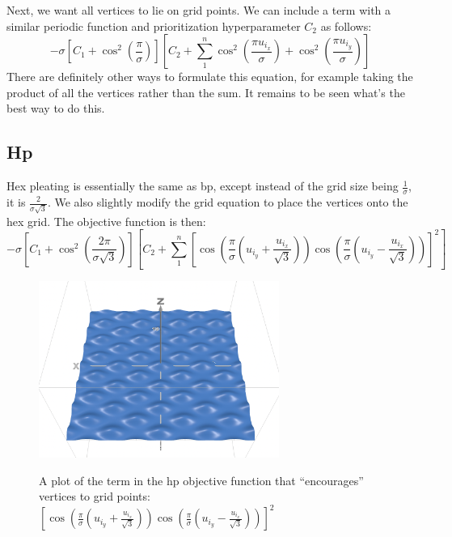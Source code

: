 \documentclass[12pt]{article}
\begin{document}
Next, we want all vertices to lie on grid points. We can include a term with a similar periodic function and prioritization hyperparameter $C_2$ as follows: 
\begin{equation}\label{eq:bp obj}
    -\sigma \left[C_1+\cos^2(\frac{\pi}{\sigma})\right]
    \left[C_2+\sum_{1}^{n}\cos^2(\frac{\pi u_{i_x}}{\sigma}) + \cos^2(\frac{\pi u_{i_y}}{\sigma})\right]
\end{equation}
There are definitely other ways to formulate this equation, for example taking the product of all the vertices rather than the sum. It remains to be seen what's the best way to do this.

\subsection{Hp}
Hex pleating is essentially the same as bp, except instead of the grid size being $\frac{1}{\sigma}$, it is $\frac{2}{\sigma \sqrt{3}}$. We also slightly modify the grid equation to place the vertices onto the hex grid. The objective function is then:
\begin{equation}\label{eq:hp obj}
    -\sigma \left[C_1+\cos^2(\frac{2\pi}{\sigma\sqrt{3}})\right]
    \left[C_2+\sum_{1}^{n}\left[\cos(
        \frac{\pi}{\sigma}(u_{i_y}+\frac{u_{i_x}}{\sqrt{3}})
    ) \cos(
        \frac{\pi}{\sigma}(u_{i_y}-\frac{u_{i_x}}{\sqrt{3}})
    )\right]^2\right]
\end{equation}
\begin{figure}[h]
    \centering
    \includegraphics[width=0.7\textwidth]{hex grid.png}
    \label{fig:hex grid}\caption{A plot of the term in the hp objective function that ``encourages'' vertices to grid points: $\left[\cos(
        \frac{\pi}{\sigma}(u_{i_y}+\frac{u_{i_x}}{\sqrt{3}})
    ) \cos(
        \frac{\pi}{\sigma}(u_{i_y}-\frac{u_{i_x}}{\sqrt{3}})
    )\right]^2$}
\end{figure}
\end{document}
